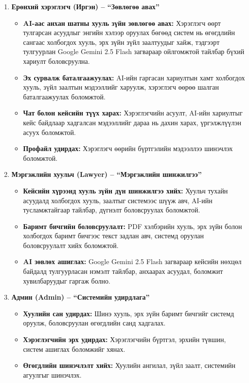 \begin{enumerate}
    \item \textbf{Ерөнхий хэрэглэгч (Иргэн) -- ``Зөвлөгөө авах''}
    \begin{itemize}
        \item \textbf{AI-аас анхан шатны хууль зүйн зөвлөгөө авах:} Хэрэглэгч өөрт тулгарсан асуудлыг энгийн хэлээр оруулах бөгөөд систем нь өгөгдлийн сангаас холбогдох хууль, эрх зүйн зүйл заалтуудыг хайж, тэдгээрт тулгуурлан Google Gemini 2.5 Flash загвараар ойлгомжтой тайлбар бүхий хариулт боловсруулна.

        \item \textbf{Эх сурвалж баталгаажуулах:} AI-ийн гаргасан хариултын хамт холбогдох хууль, зүйл заалтын мэдээллийг харуулж, хэрэглэгч өөрөө шалган баталгаажуулах боломжтой.

        \item \textbf{Чат болон кейсийн түүх харах:} Хэрэглэгчийн асуулт, AI-ийн хариултыг кейс байдлаар хадгалсан мэдээллийг дараа нь дахин харах, үргэлжлүүлэн асуух боломжтой.

        \item \textbf{Профайл удирдах:} Хэрэглэгч өөрийн бүртгэлийн мэдээллээ шинэчлэх боломжтой.
    \end{itemize}

    \item \textbf{Мэргэжлийн хуульч (Lawyer) -- ``Мэргэжлийн шинжилгээ''}
    \begin{itemize}
        \item \textbf{Кейсийн хүрээнд хууль зүйн дүн шинжилгээ хийх:} Хуульч тухайн асуудалд холбогдох хууль, заалтыг системээс шүүж авч, AI-ийн тусламжтайгаар тайлбар, дүгнэлт боловсруулах боломжтой.

        \item \textbf{Баримт бичгийн боловсруулалт:} PDF хэлбэрийн хууль, эрх зүйн болон холбогдох баримт бичгээс текст задлан авч, системд оруулан боловсруулалт хийх боломжтой.

        \item \textbf{AI зөвлөх ашиглах:} Google Gemini 2.5 Flash загвараар кейсийн нөхцөл байдалд тулгуурласан нэмэлт тайлбар, анхаарах асуудал, боломжит хувилбаруудыг гаргаж болно.
    \end{itemize}

    \item \textbf{Админ (Admin) -- ``Системийн удирдлага''}
    \begin{itemize}
        \item \textbf{Хуулийн сан удирдах:} Шинэ хууль, эрх зүйн баримт бичгийг системд оруулж, боловсруулан өгөгдлийн санд хадгалах.

        \item \textbf{Хэрэглэгчийн эрх удирдах:} Хэрэглэгчийн бүртгэл, эрхийн түвшин, систем ашиглах боломжийг хянах.

        \item \textbf{Өгөгдлийн шинэчлэлт хийх:} Хуулийн ангилал, зүйл заалт, системийн агуулгыг шинэчлэх.
    \end{itemize}
\end{enumerate}

